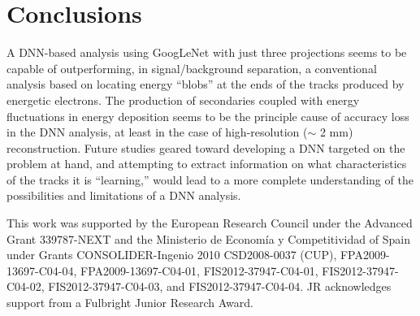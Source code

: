 \documentclass[a4paper,11pt]{article}
\begin{document}
\section{Conclusions}
A DNN-based analysis using GoogLeNet with just three projections seems to be capable of outperforming, in signal/background separation, a conventional analysis based on locating energy ``blobs'' at the ends of the tracks produced by energetic electrons.  The production of secondaries coupled with energy fluctuations in energy deposition seems to be the principle cause of accuracy loss in the DNN analysis, at least in the case of high-resolution ($\sim$ 2 mm) reconstruction.  Future studies geared toward developing a DNN targeted on the problem at hand, and attempting to extract information on what characteristics of the tracks it is ``learning,'' would lead to a more complete understanding of the possibilities and limitations of a DNN analysis.

\acknowledgments

This work was supported by the European Research Council under the Advanced Grant 339787-NEXT and the Ministerio de Econom\'{i}a y Competitividad of Spain under Grants CONSOLIDER-Ingenio 2010 CSD2008-0037 (CUP), FPA2009-13697-C04-04, FPA2009-13697-C04-01, FIS2012-37947-C04-01, FIS2012-37947-C04-02, FIS2012-37947-C04-03, and FIS2012-37947-C04-04.  JR acknowledges support from a Fulbright Junior Research Award.


\end{document}
